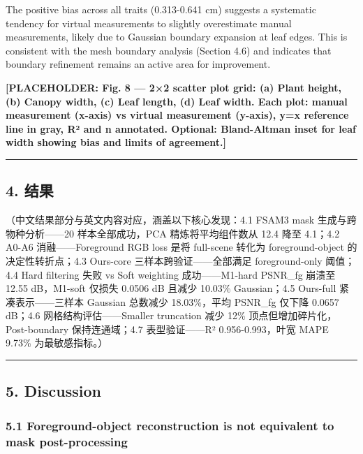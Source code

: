 \documentclass[11pt,a4paper]{article}
\begin{document}
The positive bias across all traits (0.313-0.641 cm) suggests a
systematic tendency for virtual measurements to slightly overestimate
manual measurements, likely due to Gaussian boundary expansion at leaf
edges. This is consistent with the mesh boundary analysis (Section 4.6)
and indicates that boundary refinement remains an active area for
improvement.

\textbf{{[}PLACEHOLDER: Fig. 8 --- 2×2 scatter plot grid: (a) Plant
height, (b) Canopy width, (c) Leaf length, (d) Leaf width. Each plot:
manual measurement (x-axis) vs virtual measurement (y-axis), y=x
reference line in gray, R² and n annotated. Optional: Bland-Altman inset
for leaf width showing bias and limits of agreement.{]}}

\begin{center}\rule{0.5\linewidth}{0.5pt}\end{center}

\subsection{4. 结果}\label{ux7ed3ux679c}

（中文结果部分与英文内容对应，涵盖以下核心发现：4.1 FSAM3 mask
生成与跨物种分析------20 样本全部成功，PCA 精炼将平均组件数从 12.4 降至
4.1；4.2 A0-A6 消融------Foreground RGB loss 是将 full-scene 转化为
foreground-object 的决定性转折点；4.3 Ours-core
三样本跨验证------全部满足 foreground-only 阈值；4.4 Hard filtering 失败
vs Soft weighting 成功------M1-hard PSNR\_fg 崩溃至 12.55 dB，M1-soft
仅损失 0.0506 dB 且减少 10.03\% Gaussian；4.5 Ours-full
紧凑表示------三样本 Gaussian 总数减少 18.03\%，平均 PSNR\_fg 仅下降
0.0657 dB；4.6 网格结构评估------Smaller truncation 减少 12\%
顶点但增加碎片化，Post-boundary 保持连通域；4.7 表型验证------R²
0.956-0.993，叶宽 MAPE 9.73\% 为最敏感指标。）

\begin{center}\rule{0.5\linewidth}{0.5pt}\end{center}

\subsection{5. Discussion}\label{discussion}

\subsubsection{5.1 Foreground-object reconstruction is not equivalent to
mask
post-processing}\label{foreground-object-reconstruction-is-not-equivalent-to-mask-post-processing}
\end{document}
